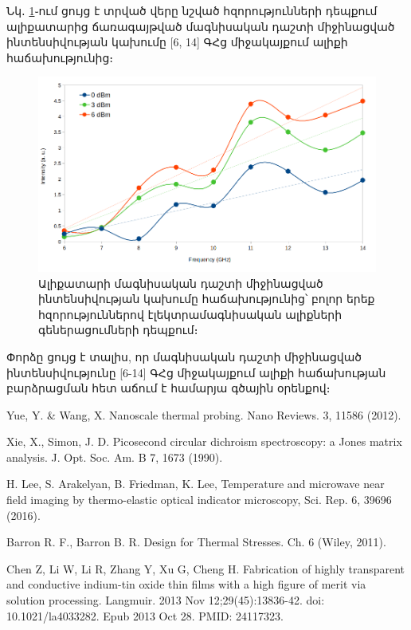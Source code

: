 \documentclass[12pt, fleqn]{report}
\begin{document}
Նկ․ \ref{fig:Int_vs_Freq_0_3_6_dBm}֊ում ցույց է տրված վերը նշված հզորությունների դեպքում ալիքատարից ճառագայթված մագնիսական դաշտի միջինացված ինտենսիվության կախումը [6, 14] ԳՀց միջակայքում ալիքի հաճախությունից։
\begin{figure}
    \centering
    \includegraphics[width=1.0\textwidth]{data/experiment-results/free_field_of_antenna_6-14GHz_0-6dBm_generator_output_distance_5mm.png}
    \caption{Ալիքատարի մագնիսական դաշտի միջինացված ինտենսիվության կախումը հաճախությունից՝ բոլոր երեք հզորություններով էլեկտրամագնիսական ալիքների գեներացումների դեպքում։}
    \label{fig:Int_vs_Freq_0_3_6_dBm}
\end{figure}
Փորձը ցույց է տալիս, որ մագնիսական դաշտի միջինացված ինտենսիվությունը [6-14] ԳՀց միջակայքում ալիքի հաճախության բարձրացման հետ աճում է համարյա գծային օրենքով։

\renewcommand{\bibname}{Գրականություն}
\begin{thebibliography}{9}

Yue, Y. \& Wang, X. Nanoscale thermal probing. Nano Reviews. 3, 11586 (2012).

Xie, X., Simon, J. D. Picosecond circular dichroism spectroscopy: a Jones matrix
analysis. J. Opt. Soc. Am. B 7, 1673 (1990).

H. Lee, S. Arakelyan, B. Friedman, K. Lee, Temperature and microwave near field imaging by thermo-elastic optical indicator microscopy, Sci. Rep. 6, 39696 (2016).

 Barron R. F., Barron B. R. Design for Thermal Stresses. Ch. 6 (Wiley, 2011).

 Chen Z, Li W, Li R, Zhang Y, Xu G, Cheng H. Fabrication of highly transparent and conductive indium-tin oxide thin films with a high figure of merit via solution processing. Langmuir. 2013 Nov 12;29(45):13836-42. doi: 10.1021/la4033282. Epub 2013 Oct 28. PMID: 24117323.
\end{thebibliography}


   
\end{document}
